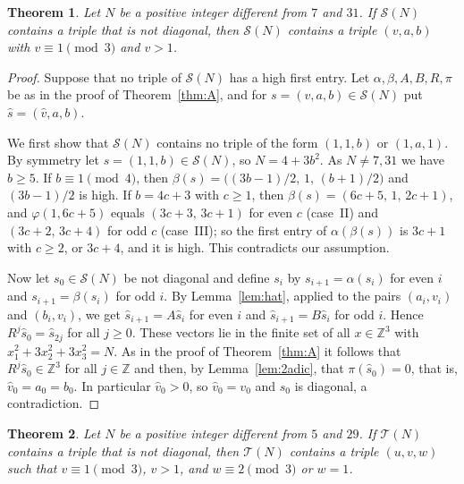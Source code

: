 \documentclass[11pt]{amsart}
\newtheorem{theorem}{Theorem}[section]
\theoremstyle{definition}
\theoremstyle{remark}
\newcommand{\Z}{\mathbb{Z}}
\newcommand{\cS}{\mathcal{S}}
\newcommand{\cT}{\mathcal{T}}
\begin{document}
\begin{theorem}\label{thm:C}
Let $N$ be a positive integer different from $7$ and $31$. If $\cS(N)$ contains a triple that is not diagonal,
then $\cS(N)$ contains a triple $(v,a,b)$ with $v\equiv 1\pmod 3$ and $v>1$.
\end{theorem}

\begin{proof}
Suppose that no triple of $\cS(N)$ has a high first entry. Let $\alpha,\beta,A,B,R,\pi$ be as in the proof of Theorem~\ref{thm:A},
and for $s=(v,a,b)\in\cS(N)$ put $\hat s=(\hat v,a,b)$.

We first show that $\cS(N)$ contains no triple of the form $(1,1,b)$ or $(1,a,1)$. By symmetry let $s=(1,1,b)\in\cS(N)$, so $N=4+3b^2$.
As $N\ne 7,31$ we have $b\ge 5$. If $b\equiv 1\pmod 4$, then $\beta(s)=\bigl((3b-1)/2,\,1,\,(b+1)/2\bigr)$ and $(3b-1)/2$ is high.
If $b=4c+3$ with $c\ge 1$, then $\beta(s)=(6c+5,\,1,\,2c+1)$, and
$\varphi(1,6c+5)$ equals $(3c+3,\,3c+1)$ for even $c$ (case~II) and $(3c+2,\,3c+4)$ for odd $c$ (case~III);
so the first entry of $\alpha(\beta(s))$ is $3c+1$ with $c\ge 2$, or $3c+4$, and it is high. This contradicts our assumption.

Now let $s_0\in\cS(N)$ be not diagonal and define $s_i$ by $s_{i+1}=\alpha(s_i)$ for even $i$ and $s_{i+1}=\beta(s_i)$ for odd $i$.
By Lemma~\ref{lem:hat}, applied to the pairs $(a_i,v_i)$ and $(b_i,v_i)$, we get $\hat s_{i+1}=A\hat s_i$ for even $i$ and $\hat s_{i+1}=B\hat s_i$ for odd $i$.
Hence $R^j\hat s_0=\hat s_{2j}$ for all $j\ge 0$. These vectors lie in the finite set of all $x\in\Z^3$ with $x_1^2+3x_2^2+3x_3^2=N$.
As in the proof of Theorem~\ref{thm:A} it follows that $R^j\hat s_0\in\Z^3$ for all $j\in\Z$ and then, by Lemma~\ref{lem:2adic}, that $\pi(\hat s_0)=0$,
that is, $\hat v_0=a_0=b_0$. In particular $\hat v_0>0$, so $\hat v_0=v_0$ and $s_0$ is diagonal, a contradiction.
\end{proof}

\begin{theorem}\label{thm:D}
Let $N$ be a positive integer different from $5$ and $29$. If $\cT(N)$ contains a triple that is not diagonal,
then $\cT(N)$ contains a triple $(u,v,w)$ such that $v\equiv 1\pmod 3$, $v>1$, and $w\equiv 2\pmod 3$ or $w=1$.
\end{theorem}
\end{document}
